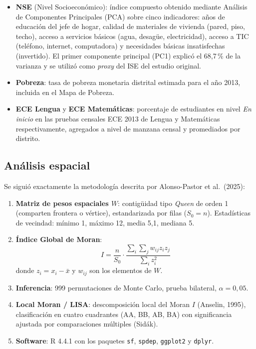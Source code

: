 \documentclass[12pt,a4paper]{article}
\begin{document}
\begin{itemize}
  \item \textbf{NSE} (Nivel Socioeconómico): índice compuesto obtenido mediante Análisis de Componentes Principales (PCA) sobre cinco indicadores: años de educación del jefe de hogar, calidad de materiales de vivienda (pared, piso, techo), acceso a servicios básicos (agua, desagüe, electricidad), acceso a TIC (teléfono, internet, computadora) y necesidades básicas insatisfechas (invertido). El primer componente principal (PC1) explicó el 68{,}7\,\% de la varianza y se utilizó como \textit{proxy} del ISE del estudio original.
  \item \textbf{Pobreza}: tasa de pobreza monetaria distrital estimada para el año 2013, incluida en el Mapa de Pobreza.
  \item \textbf{ECE Lengua} y \textbf{ECE Matemáticas}: porcentaje de estudiantes en nivel \textit{En inicio} en las pruebas censales ECE 2013 de Lengua y Matemáticas respectivamente, agregados a nivel de manzana censal y promediados por distrito.
\end{itemize}

\subsection{Análisis espacial}

Se siguió exactamente la metodología descrita por Alonso-Pastor et al.\ (2025):

\begin{enumerate}
  \item \textbf{Matriz de pesos espaciales $W$}: contigüidad tipo \textit{Queen} de orden 1 (comparten frontera o vértice), estandarizada por filas ($S_0 = n$). Estadísticas de vecindad: mínimo 1, máximo 12, media 5,1, mediana 5.
  \item \textbf{Índice Global de Moran}:
    \begin{equation}
      I = \frac{n}{S_0} \cdot \frac{\sum_i \sum_j w_{ij} z_i z_j}{\sum_i z_i^2}
    \end{equation}
    donde $z_i = x_i - \bar{x}$ y $w_{ij}$ son los elementos de $W$.
  \item \textbf{Inferencia}: 999 permutaciones de Monte Carlo, prueba bilateral, $\alpha = 0{,}05$.
  \item \textbf{Local Moran / LISA}: descomposición local del Moran $I$ (Anselin, 1995), clasificación en cuatro cuadrantes (AA, BB, AB, BA) con significancia ajustada por comparaciones múltiples (Sidák).
  \item \textbf{Software}: R 4.4.1 con los paquetes \texttt{sf}, \texttt{spdep}, \texttt{ggplot2} y \texttt{dplyr}.
\end{enumerate}
\end{document}
